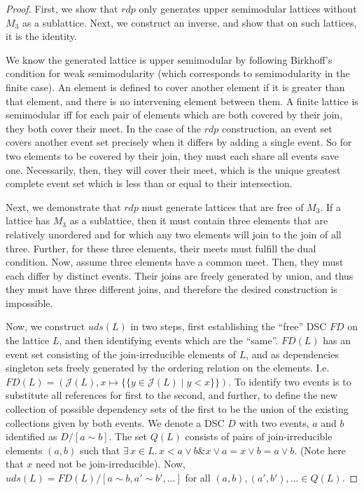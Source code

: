 \documentclass[hoptionsi,review,screen,format=sigconf]{acmart}
\theoremstyle{definition}
\newcommand{\Jc}{\mathcal{J}}
\newcommand{\band}{\mathop{\&}}
\begin{document}
\begin{proof}
First, we show that \(rdp\) only generates upper semimodular lattices without \(M_3\) as a sublattice. Next, we construct an inverse, and show that on such lattices, it is the identity.

We know the generated lattice is upper semimodular by following Birkhoff's condition for weak semimodularity (which corresponds to semimodularity in the finite case). An element is defined to cover another element if it is greater than that element, and there is no intervening element between them. A finite lattice is semimodular iff for each pair of elements which are both covered by their join, they both cover their meet. In the case of the \(rdp\) construction, an event set covers another event set precisely when it differs by adding a single event. So for two elements to be covered by their join, they must each share all events save one. Necessarily, then, they will cover their meet, which is the unique greatest complete event set which is less than or equal to their intersection.

Next, we demonstrate that \(rdp\) must generate lattices that are free of \(M_3\). If a lattice has \(M_3\) as a sublattice, then it must contain three elements that are relatively unordered and for which any two elements will join to the join of all three. Further, for these three elements, their meets must fulfill the dual condition. Now, assume three elements have a common meet. Then, they must each differ by distinct events.  Their joins are freely generated by union, and thus they must have three different joins, and therefore the desired construction is impossible.

Now, we construct \(uds(L)\) in two steps, first establishing the ``free'' DSC \(FD\) on the lattice \(L\), and then identifying events which are the ``same''. \(FD(L)\) has an event set consisting of the join-irreducible elements of \(L\), and as dependencies singleton sets freely generated by the ordering relation on the elements.  I.e. \(FD(L) = (\Jc(L), x \mapsto \{\{ y \in \Jc(L) \mid y<x\}\})\). To identify two events is to substitute all references for first to the second, and further, to define the new collection of possible dependency sets of the first to be the union of the existing collections given by both events. We denote a DSC \(D\) with two events, \(a\) and \(b\) identified as  \(D/[a\sim b]\). The set \(Q(L)\) consists of pairs of join-irreducible elements \((a,b)\) such that  \(\exists\, x \in L . \,  x < a \vee b \band x \vee a = x \vee b = a \vee b\). (Note here that \(x\) need not be join-irreducible). Now, \(uds(L) = FD(L)/[a \sim b,a' \sim b',...]\) for all \((a,b), (a',b'), ...\in Q(L)\).


\end{proof}
\end{document}
